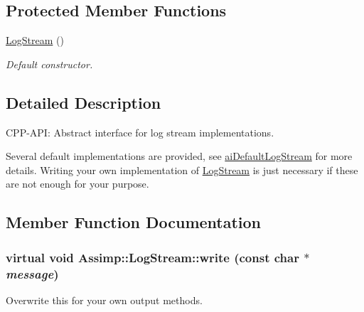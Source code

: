 \subsection*{Protected Member Functions}
\begin{CompactItemize}
\item 
\hypertarget{class_assimp_1_1_log_stream_c6863075fc4a6fcffd76ad6af80c18bc}{
\hyperlink{class_assimp_1_1_log_stream_c6863075fc4a6fcffd76ad6af80c18bc}{LogStream} ()}
\label{class_assimp_1_1_log_stream_c6863075fc4a6fcffd76ad6af80c18bc}

\begin{CompactList}\small\item\em Default constructor. \item\end{CompactList}\end{CompactItemize}


\subsection{Detailed Description}
CPP-API: Abstract interface for log stream implementations. 

Several default implementations are provided, see \hyperlink{types_8h_e4271f61a7c06cd4770fc3e11f58f9c6}{aiDefaultLogStream} for more details. Writing your own implementation of \hyperlink{class_assimp_1_1_log_stream}{LogStream} is just necessary if these are not enough for your purpose. 

\subsection{Member Function Documentation}
\hypertarget{class_assimp_1_1_log_stream_b0bfcb5ab9988ef65d7222a50f6e8d37}{
\subsubsection[write]{\setlength{\rightskip}{0pt plus 5cm}virtual void Assimp::LogStream::write (const char $\ast$ {\em message})}}
\label{class_assimp_1_1_log_stream_b0bfcb5ab9988ef65d7222a50f6e8d37}


Overwrite this for your own output methods. 

